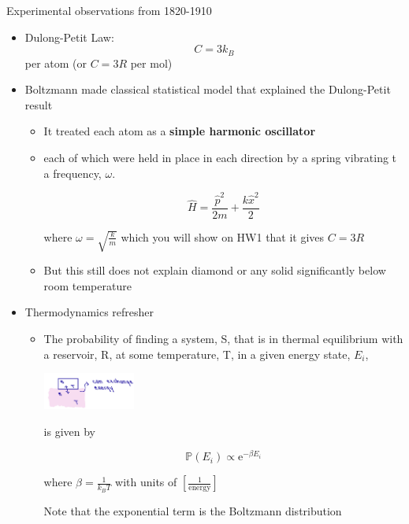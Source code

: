 Experimental observations from 1820-1910
\begin{itemize}
    \item Dulong-Petit Law:
    \begin{equation}
        C = 3 k_B 
    \end{equation}
    per atom (or $C=3R$ per mol)
    \item Boltzmann made classical statistical model that explained the Dulong-Petit result
    \begin{itemize}
        \item It treated each atom as a \textbf{simple harmonic oscillator} 
        \item each of which were held in place in each direction by a spring vibrating t a frequency, $\omega$.

        \begin{equation}
            \hat{H} = \frac{\hat{p}^2}{2m} + \frac{k\hat{x}^2}{2}
        \end{equation}

        where $\omega = \sqrt{\frac{k}{m}}$ which you will show on HW1 that it gives $C=3R$

        \item But this still does not explain diamond or any solid significantly below room temperature
    \end{itemize}

    \item Thermodynamics refresher

    \begin{itemize}
        \item The probability of finding a system, S, that is in thermal equilibrium with a reservoir, R, at some temperature, T, in a given energy state, $E_i$, 
        \begin{center}
        \includegraphics[width = 0.25\textwidth]{Images/Lecture2-thermo.png}
        \end{center}
        
        is given by 

        \[
        \mathbb{P}(E_i) \propto \mathrm{e}^{-\beta E_i}
        \]

        where $\beta = \frac{1}{k_B T}$ with units of $\left[ \frac{1}{\text{energy}}\right]$

        Note that the exponential term is the Boltzmann distribution


\end{itemize}
\end{itemize}
